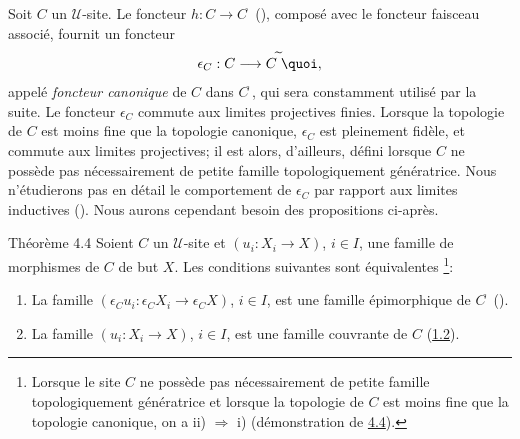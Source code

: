 \setcounter{subsection}{4} \setcounter{subsubsection}{-1}
\subsubsection{}
Soit $C$ un $𝒰$-site. Le foncteur $h:C\rightarrow
C^{\widehat{\phantom{,}}}$ (), composé avec
le foncteur faisceau associé, fournit un foncteur$$
\epsilon_C:C\longrightarrow C^{\widetilde{\phantom{,}}}{\quoi},
$$
appelé \emph{foncteur canonique} de $C$ dans
$C^{\widetilde{\phantom{,}}}$, qui sera constamment utilisé par la
suite. Le foncteur $\epsilon_C$ commute aux limites projectives
finies. Lorsque la topologie de $C$ est moins fine que la topologie
canonique, $\epsilon_C$ est pleinement fidèle, et commute aux
limites projectives; il est alors, d'ailleurs, défini lorsque $C$
ne possède pas nécessairement de petite famille
topologiquement génératrice. Nous n'étudierons pas en détail
le comportement de $\epsilon_C$ par rapport aux limites inductives
(\cf [SGA 3 IV]). Nous aurons cependant besoin des propositions
ci-après.

\begin{enonce*}{Théorème 4.4}
Soient $C$ un $𝒰$-site et $(u_i:X_i\rightarrow X)$, $i\in
I$, une famille de morphismes de $C$ de but $X$. Les conditions
suivantes sont équivalentes \footnote[1]{Lorsque le site $C$ ne
possède pas nécessairement de petite famille topologiquement
génératrice et lorsque la topologie de $C$ est moins fine que la
topologie canonique, on a ii) $\Rightarrow$ i) (\cf démonstration
de \hyperref[II.theo4.4]{4.4}).}:
\begin{enumerate}
\renewcommand{\theenumi}{\roman{enumi}}
\renewcommand{\labelenumi}{\theenumi)}
\item La famille $(\epsilon_C u_i:\epsilon_C X_i\rightarrow \epsilon_C
  X)$, $i\in I$, est une famille épimorphique de
  $C^{\widetilde{\phantom{,}}}$ {\rm().}\pageoriginale

\item La famille $(u_i:X_i\rightarrow X)$, $i\in I$, est une famille
  couvrante de $C$ (\hyperref[II.def1.2]{1.2}).
\end{enumerate}
\end{enonce*}

